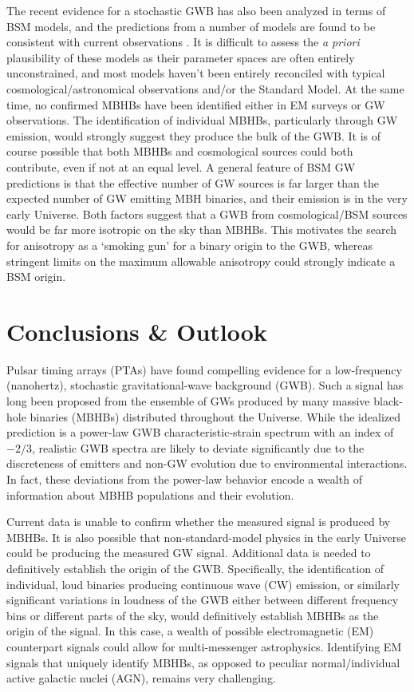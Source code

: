 \documentclass[onecolumn,authoryear]{els-mrw}
\begin{document}
The recent evidence for a stochastic GWB has also been analyzed in terms of BSM models, and the predictions from a number of models are found to be consistent with current observations \citep{Afzal+2023}.  It is difficult to assess the \textit{a priori} plausibility of these models as their parameter spaces are often entirely unconstrained, and most models haven't been entirely reconciled with typical cosmological/astronomical observations and/or the Standard Model.  At the same time, no confirmed MBHBs have been identified either in EM surveys or GW observations.  The identification of individual MBHBs, particularly through GW emission, would strongly suggest they produce the bulk of the GWB.  It is of course possible that both MBHBs and cosmological sources could both contribute, even if not at an equal level.  A general feature of BSM GW predictions is that the effective number of GW sources is far larger than the expected number of GW emitting MBH binaries, and their emission is in the very early Universe.  Both factors suggest that a GWB from cosmological/BSM sources would be far more isotropic on the sky than MBHBs.  This motivates the search for anisotropy as a `smoking gun' for a binary origin to the GWB, whereas stringent limits on the maximum allowable anisotropy could strongly indicate a BSM origin.


\section*{Conclusions \& Outlook}

Pulsar timing arrays (PTAs) have found compelling evidence for a low-frequency (nanohertz), stochastic gravitational-wave background (GWB).  Such a signal has long been proposed from the ensemble of GWs produced by many massive black-hole binaries (MBHBs) distributed throughout the Universe.  While the idealized prediction is a power-law GWB characteristic-strain spectrum with an index of $-2/3$, realistic GWB spectra are likely to deviate significantly due to the discreteness of emitters and non-GW evolution due to environmental interactions.  In fact, these deviations from the power-law behavior encode a wealth of information about MBHB populations and their evolution.

Current data is unable to confirm whether the measured signal is produced by MBHBs.  It is also possible that non-standard-model physics in the early Universe could be producing the measured GW signal.  Additional data is needed to definitively establish the origin of the GWB.  Specifically, the identification of individual, loud binaries producing continuous wave (CW) emission, or similarly significant variations in loudness of the GWB either between different frequency bins or different parts of the sky, would definitively establish MBHBs as the origin of the signal.  In this case, a wealth of possible electromagnetic (EM) counterpart signals could allow for multi-messenger astrophysics.  Identifying EM signals that uniquely identify MBHBs, as opposed to peculiar normal/individual active galactic nuclei (AGN), remains very challenging.
\end{document}
